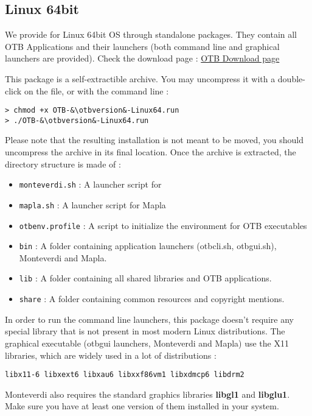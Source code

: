 \subsection{Linux 64bit}

We provide \app for Linux 64bit OS through standalone packages.
They contain all OTB Applications and their launchers (both command line and graphical
launchers are provided). Check the download page :
\href{https://www.orfeo-toolbox.org/download}{OTB Download page}

This package is a self-extractible archive. You may uncompress it with a
double-click on the file, or with the command line :


\begin{lstlisting}[frame=none,numbers=none]
> chmod +x OTB-&\otbversion&-Linux64.run
> ./OTB-&\otbversion&-Linux64.run
\end{lstlisting}

Please note that the resulting installation is not meant to be moved, you should
uncompress the archive in its final location. Once the archive is extracted,
the directory structure is made of :
\begin{itemize}
\item \verb?monteverdi.sh? : A launcher script for \mont
\item \verb?mapla.sh? : A launcher script for Mapla
\item \verb?otbenv.profile? : A script to initialize the environment for OTB executables
\item \verb?bin? : A folder containing application launchers (otbcli\textunderscore *.sh,
otbgui\textunderscore *.sh), Monteverdi and Mapla.
\item \verb?lib? : A folder containing all shared libraries and OTB applications.
\item \verb?share? : A folder containing common resources and copyright mentions.
\end{itemize}

In order to run the command line launchers, this package doesn't require any special
library that is not present in most modern Linux distributions. The graphical
executable (otbgui launchers, Monteverdi and Mapla) use the X11 libraries, which
are widely used in a lot of distributions :

\begin{verbatim}
libx11-6 libxext6 libxau6 libxxf86vm1 libxdmcp6 libdrm2
\end{verbatim}
Monteverdi also requires the standard graphics libraries \textbf{libgl1} and
\textbf{libglu1}. Make sure you have at least one version of them installed in
your system.

